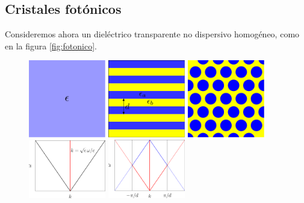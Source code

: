 \documentclass[12pt]{article}
\begin{document}
\subsection{Cristales fotónicos}
Consideremos ahora un dieléctrico transparente no dispersivo
homogéneo, como en la figura \ref{fig:fotonico}.
\begin{figure}
  \centering
  \includegraphics[width=0.3\textwidth]{talk-9}
  \includegraphics[width=0.3\textwidth]{talk-10}
  \includegraphics[width=0.3\textwidth]{talk-11}
  \\
  \includegraphics[width=0.3\textwidth]{wvsk1-0}
  \includegraphics[width=0.3\textwidth]{wvsk1-1}

\end{figure}
\end{document}
